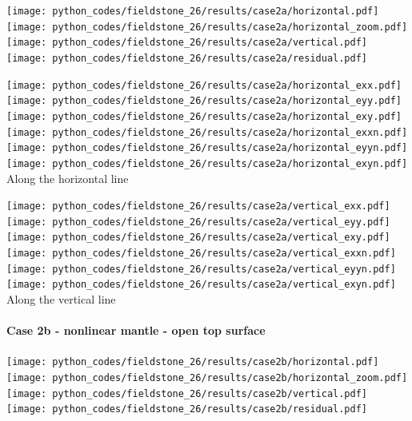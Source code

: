 \begin{center}
\texttt{[image: python\_codes/fieldstone\_26/results/case2a/horizontal.pdf]}
\texttt{[image: python\_codes/fieldstone\_26/results/case2a/horizontal\_zoom.pdf]}\\
\texttt{[image: python\_codes/fieldstone\_26/results/case2a/vertical.pdf]}
\texttt{[image: python\_codes/fieldstone\_26/results/case2a/residual.pdf]}
\end{center}

\begin{center}
\texttt{[image: python\_codes/fieldstone\_26/results/case2a/horizontal\_exx.pdf]}
\texttt{[image: python\_codes/fieldstone\_26/results/case2a/horizontal\_eyy.pdf]}
\texttt{[image: python\_codes/fieldstone\_26/results/case2a/horizontal\_exy.pdf]}\\
\texttt{[image: python\_codes/fieldstone\_26/results/case2a/horizontal\_exxn.pdf]}
\texttt{[image: python\_codes/fieldstone\_26/results/case2a/horizontal\_eyyn.pdf]}
\texttt{[image: python\_codes/fieldstone\_26/results/case2a/horizontal\_exyn.pdf]}\\
{\captionfont Along the horizontal line}
\end{center}

\begin{center}
\texttt{[image: python\_codes/fieldstone\_26/results/case2a/vertical\_exx.pdf]}
\texttt{[image: python\_codes/fieldstone\_26/results/case2a/vertical\_eyy.pdf]}
\texttt{[image: python\_codes/fieldstone\_26/results/case2a/vertical\_exy.pdf]}\\
\texttt{[image: python\_codes/fieldstone\_26/results/case2a/vertical\_exxn.pdf]}
\texttt{[image: python\_codes/fieldstone\_26/results/case2a/vertical\_eyyn.pdf]}
\texttt{[image: python\_codes/fieldstone\_26/results/case2a/vertical\_exyn.pdf]}\\
{\captionfont Along the vertical line}
\end{center}






\newpage
\paragraph{Case 2b - nonlinear mantle - open top surface} 

\begin{center}
\texttt{[image: python\_codes/fieldstone\_26/results/case2b/horizontal.pdf]}
\texttt{[image: python\_codes/fieldstone\_26/results/case2b/horizontal\_zoom.pdf]}\\
\texttt{[image: python\_codes/fieldstone\_26/results/case2b/vertical.pdf]}
\texttt{[image: python\_codes/fieldstone\_26/results/case2b/residual.pdf]}
\end{center}

